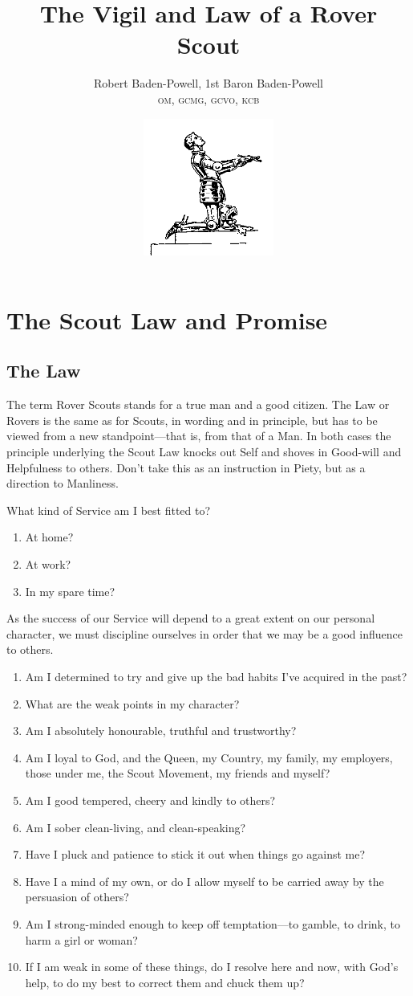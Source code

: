 \documentclass[11pt]{article}
\title{The Vigil and Law of a Rover Scout}%
\author{Robert Baden-Powell, 1st Baron Baden-Powell \\ \small{\textsc{om, gcmg, gcvo, kcb}}}
\date{ \includegraphics[width=0.32\textwidth]{knight} } %
\begin{document}
\maketitle

\pagebreak

\tableofcontents


\break
\section{The Scout Law and Promise}

\subsection{The Law}
The term Rover Scouts stands for a true man and a good citizen. The Law or Rovers is the same as for Scouts, in wording and in principle, but has to be viewed from a new standpoint---that is, from that of a Man. In both cases the principle underlying the Scout Law knocks out Self and shoves in Good-will and Helpfulness to others. Don't take this as an instruction in Piety, but as a direction to Manliness.

What kind of Service am I best fitted to?
\begin{enumerate}
  \item At home?
  \item At work?
  \item In my spare time?
\end{enumerate}

As the success of our Service will depend to a great extent on our personal character, we must discipline ourselves in order that we may be a good influence to others.
\begin{enumerate}
  \item Am I determined to try and give up the bad habits I've acquired in the past?
  \item What are the weak points in my character?
  \item Am I absolutely honourable, truthful and trustworthy?
  \item Am I loyal to God, and the Queen, my Country, my family, my employers, those under me, the Scout Movement, my friends and myself?
  \item Am I good tempered, cheery and kindly to others?
  \item Am I sober clean-living, and clean-speaking?
  \item Have I pluck and patience to stick it out when things go against me?
  \item Have I a mind of my own, or do I allow myself to be carried away by the persuasion of others?
  \item Am I strong-minded enough to keep off temptation---to gamble, to drink, to harm a girl or woman?
  \item If I am weak in some of these things, do I resolve here and now, with God's help, to do my best to correct them and chuck them up?
\end{enumerate}
\end{document}
